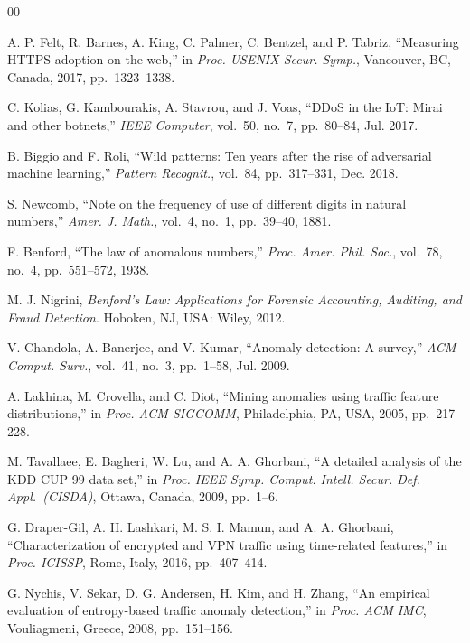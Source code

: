 \documentclass[conference]{IEEEtran}
\begin{document}
\begin{thebibliography}{00}

A. P. Felt, R. Barnes, A. King, C. Palmer, C. Bentzel, and P. Tabriz,
``Measuring HTTPS adoption on the web,''
in \textit{Proc. USENIX Secur. Symp.}, Vancouver, BC, Canada, 2017,
pp.~1323--1338.

C. Kolias, G. Kambourakis, A. Stavrou, and J. Voas,
``DDoS in the IoT: Mirai and other botnets,''
\textit{IEEE Computer}, vol.~50, no.~7, pp.~80--84, Jul. 2017.

B. Biggio and F. Roli,
``Wild patterns: Ten years after the rise of adversarial machine learning,''
\textit{Pattern Recognit.}, vol.~84, pp.~317--331, Dec. 2018.

S. Newcomb,
``Note on the frequency of use of different digits in natural numbers,''
\textit{Amer. J. Math.}, vol.~4, no.~1, pp.~39--40, 1881.

F. Benford,
``The law of anomalous numbers,''
\textit{Proc. Amer. Phil. Soc.}, vol.~78, no.~4, pp.~551--572, 1938.

M. J. Nigrini,
\textit{Benford's Law: Applications for Forensic Accounting, Auditing,
and Fraud Detection}.
Hoboken, NJ, USA: Wiley, 2012.

V. Chandola, A. Banerjee, and V. Kumar,
``Anomaly detection: A survey,''
\textit{ACM Comput. Surv.}, vol.~41, no.~3, pp.~1--58, Jul. 2009.

A. Lakhina, M. Crovella, and C. Diot,
``Mining anomalies using traffic feature distributions,''
in \textit{Proc. ACM SIGCOMM}, Philadelphia, PA, USA, 2005,
pp.~217--228.

M. Tavallaee, E. Bagheri, W. Lu, and A. A. Ghorbani,
``A detailed analysis of the KDD CUP 99 data set,''
in \textit{Proc. IEEE Symp. Comput. Intell. Secur. Def. Appl.\ (CISDA)},
Ottawa, Canada, 2009, pp.~1--6.

G. Draper-Gil, A. H. Lashkari, M. S. I. Mamun, and A. A. Ghorbani,
``Characterization of encrypted and VPN traffic using time-related features,''
in \textit{Proc. ICISSP}, Rome, Italy, 2016, pp.~407--414.

G. Nychis, V. Sekar, D. G. Andersen, H. Kim, and H. Zhang,
``An empirical evaluation of entropy-based traffic anomaly detection,''
in \textit{Proc. ACM IMC}, Vouliagmeni, Greece, 2008, pp.~151--156.


\end{thebibliography}
\end{document}
